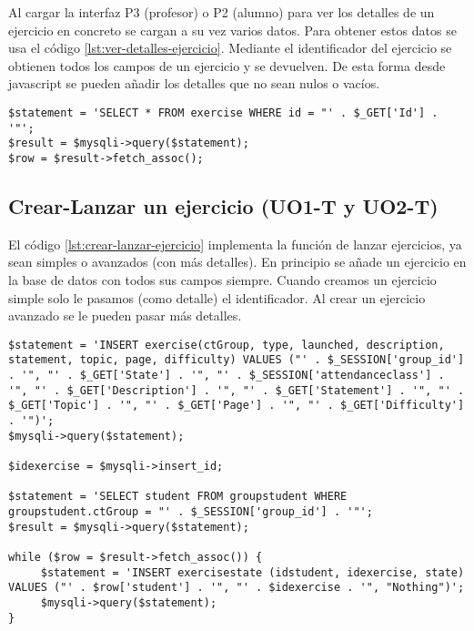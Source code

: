 Al cargar la interfaz P3 (profesor) o P2 (alumno) para ver los detalles de un ejercicio en concreto se cargan a su vez varios datos. Para obtener estos datos se usa el código \ref{lst:ver-detalles-ejercicio}. Mediante el identificador del ejercicio se obtienen todos los campos de un ejercicio y se devuelven. De esta forma desde javascript se pueden añadir los detalles que no sean nulos o vacíos.\\

\noindent
\begin{lstlisting}[caption=Ver detalles de un ejercicio.,label={lst:ver-detalles-ejercicio}]
$statement = 'SELECT * FROM exercise WHERE id = "' . $_GET['Id'] . '"';
$result = $mysqli->query($statement);
$row = $result->fetch_assoc();
\end{lstlisting}

\subsection{Crear-Lanzar un ejercicio (UO1-T y UO2-T)}
\label{diseno-e-implementacion:logica-negocio:crear-lanzar-ejercicio}

El código \ref{lst:crear-lanzar-ejercicio} implementa la función de lanzar ejercicios, ya sean simples o avanzados (con más detalles). En principio se añade un ejercicio en la base de datos con todos sus campos siempre. Cuando creamos un ejercicio simple solo le pasamos (como detalle) el identificador. Al crear un ejercicio avanzado se le pueden pasar más detalles.\\

\noindent
\begin{lstlisting}[caption=Crear-lanzar un ejercicio.,label={lst:crear-lanzar-ejercicio}]
$statement = 'INSERT exercise(ctGroup, type, launched, description, statement, topic, page, difficulty) VALUES ("' . $_SESSION['group_id'] . '", "' . $_GET['State'] . '", "' . $_SESSION['attendanceclass'] . '", "' . $_GET['Description'] . '", "' . $_GET['Statement'] . '", "' . $_GET['Topic'] . '", "' . $_GET['Page'] . '", "' . $_GET['Difficulty'] . '")';
$mysqli->query($statement);

$idexercise = $mysqli->insert_id;

$statement = 'SELECT student FROM groupstudent WHERE groupstudent.ctGroup = "' . $_SESSION['group_id'] . '"';
$result = $mysqli->query($statement);

while ($row = $result->fetch_assoc()) {
     $statement = 'INSERT exercisestate (idstudent, idexercise, state) VALUES ("' . $row['student'] . '", "' . $idexercise . '", "Nothing")';
     $mysqli->query($statement);
}
\end{lstlisting}

